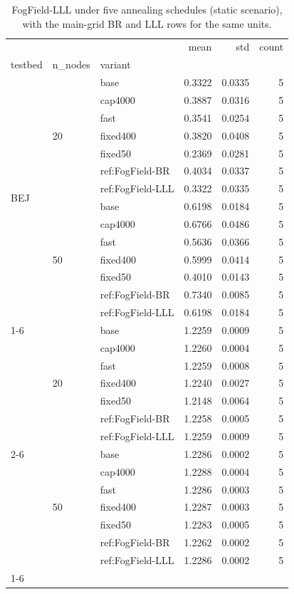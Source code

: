 \begin{table}
\caption{FogField-LLL under five annealing schedules (static scenario), with the main-grid BR and LLL rows for the same units.}
\label{tab:table9_lll_schedule}
\begin{tabular}{lllrrr}
\toprule
 &  &  & mean & std & count \\
testbed & n_nodes & variant &  &  &  \\
\midrule
\multirow[t]{14}{*}{BEJ} & \multirow[t]{7}{*}{20} & base & 0.3322 & 0.0335 & 5 \\
 &  & cap4000 & 0.3887 & 0.0316 & 5 \\
 &  & fast & 0.3541 & 0.0254 & 5 \\
 &  & fixed400 & 0.3820 & 0.0408 & 5 \\
 &  & fixed50 & 0.2369 & 0.0281 & 5 \\
 &  & ref:FogField-BR & 0.4034 & 0.0337 & 5 \\
 &  & ref:FogField-LLL & 0.3322 & 0.0335 & 5 \\
\cline{2-6}
 & \multirow[t]{7}{*}{50} & base & 0.6198 & 0.0184 & 5 \\
 &  & cap4000 & 0.6766 & 0.0486 & 5 \\
 &  & fast & 0.5636 & 0.0366 & 5 \\
 &  & fixed400 & 0.5999 & 0.0414 & 5 \\
 &  & fixed50 & 0.4010 & 0.0143 & 5 \\
 &  & ref:FogField-BR & 0.7340 & 0.0085 & 5 \\
 &  & ref:FogField-LLL & 0.6198 & 0.0184 & 5 \\
\cline{1-6} \cline{2-6}
\multirow[t]{14}{*}{MEL} & \multirow[t]{7}{*}{20} & base & 1.2259 & 0.0009 & 5 \\
 &  & cap4000 & 1.2260 & 0.0004 & 5 \\
 &  & fast & 1.2259 & 0.0008 & 5 \\
 &  & fixed400 & 1.2240 & 0.0027 & 5 \\
 &  & fixed50 & 1.2148 & 0.0064 & 5 \\
 &  & ref:FogField-BR & 1.2258 & 0.0005 & 5 \\
 &  & ref:FogField-LLL & 1.2259 & 0.0009 & 5 \\
\cline{2-6}
 & \multirow[t]{7}{*}{50} & base & 1.2286 & 0.0002 & 5 \\
 &  & cap4000 & 1.2288 & 0.0004 & 5 \\
 &  & fast & 1.2286 & 0.0003 & 5 \\
 &  & fixed400 & 1.2287 & 0.0003 & 5 \\
 &  & fixed50 & 1.2283 & 0.0005 & 5 \\
 &  & ref:FogField-BR & 1.2262 & 0.0002 & 5 \\
 &  & ref:FogField-LLL & 1.2286 & 0.0002 & 5 \\
\cline{1-6} \cline{2-6}
\bottomrule
\end{tabular}
\end{table}

